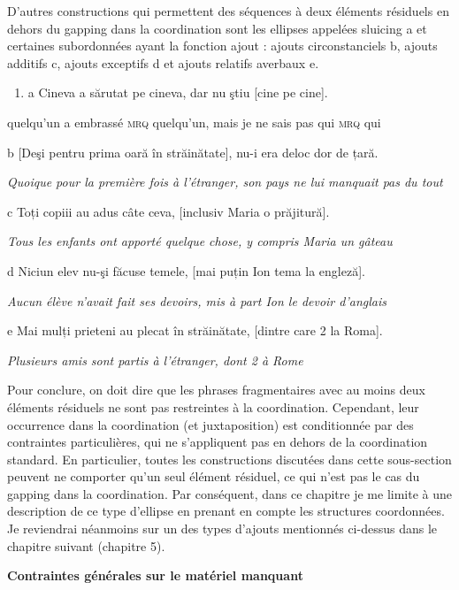 D'autres constructions qui permettent des séquences à deux éléments résiduels en dehors du gapping dans la coordination sont les ellipses appelées sluicing a et certaines subordonnées ayant la fonction ajout : ajouts circonstanciels b, ajouts additifs c, ajouts exceptifs d et ajouts relatifs averbaux e. 


\begin{enumerate}
\item \label{bkm:Ref289276295}a  Cineva a sărutat pe cineva, dar nu ştiu [cine pe cine].


\end{enumerate}
quelqu'un a embrassé \textsc{mrq} quelqu'un, mais je ne sais pas qui \textsc{mrq} qui

  b  [Deşi pentru prima oară în străinătate], nu-i era deloc dor de țară.

{\itshape
Quoique pour la première fois à l'étranger, son pays ne lui manquait pas du tout}

  c  Toți copiii au adus câte ceva, [inclusiv Maria o prăjitură].

{\itshape
Tous les enfants ont apporté quelque chose, y compris Maria un gâteau}

  d  Niciun elev nu-şi făcuse temele, [mai puțin Ion tema la engleză].

{\itshape
Aucun élève n'avait fait ses devoirs, mis à part Ion le devoir d'anglais } 

  e  Mai mulți prieteni au plecat în străinătate, [dintre care 2 la Roma].

    \textit{Plusieurs amis sont partis à l'étranger, dont 2 à Rome}

Pour conclure, on doit dire que les phrases fragmentaires avec au moins deux éléments résiduels ne sont pas restreintes à la coordination. Cependant, leur occurrence dans la coordination (et juxtaposition) est conditionnée par des contraintes particulières, qui ne s'appliquent pas en dehors de la coordination standard. En particulier, toutes les constructions discutées dans cette sous-section peuvent ne comporter qu'un seul élément résiduel, ce qui n'est pas le cas du gapping dans la coordination. Par conséquent, dans ce chapitre je me limite à une description de ce type d'ellipse en prenant en compte les structures coordonnées. Je reviendrai néanmoins sur un des types d'ajouts mentionnés ci-dessus dans le chapitre suivant (chapitre 5). 

{\bfseries
Contraintes générales sur le matériel manquant}

